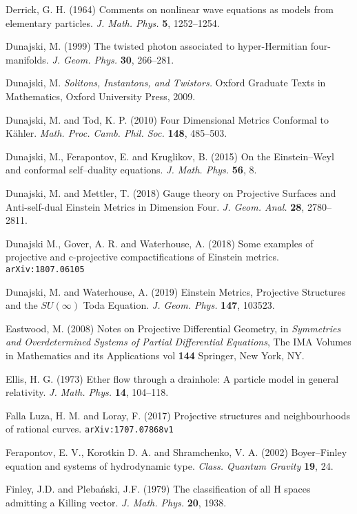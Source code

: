 \begin{thebibliography}{}
 Derrick, G. H. (1964)
Comments on nonlinear wave equations as models from elementary particles. \textit{J. Math. Phys.} {\bf 5}, 1252--1254.



 Dunajski, M. (1999) The twisted photon associated to hyper-Hermitian four-manifolds. \textit{J. Geom. Phys.} {\bf 30}, 266--281.

 Dunajski, M. \textit{Solitons, Instantons, and Twistors.} Oxford Graduate Texts in Mathematics, Oxford University Press, 2009.

 Dunajski, M. and Tod, K. P. (2010) Four Dimensional Metrics Conformal to K\"ahler. \textit{Math. Proc. Camb. Phil. Soc.} {\bf 148}, 485--503.

 Dunajski, M., Ferapontov, E. and Kruglikov, B. (2015)
On the Einstein--Weyl and conformal self--duality equations. \textit{J. Math. Phys.} {\bf 56}, 8.

 Dunajski, M. and Mettler, T. (2018) Gauge theory on Projective Surfaces and Anti-self-dual Einstein Metrics in Dimension Four.  
\textit{J. Geom. Anal.} {\bf 28}, 2780--2811.

 Dunajski M., Gover, A. R. and Waterhouse, A. (2018) Some examples of projective and c-projective compactifications of Einstein metrics.  {\tt arXiv:1807.06105}

 
 Dunajski, M. and Waterhouse, A. (2019)
Einstein Metrics, Projective Structures and the $SU(\infty)$ Toda Equation.
\textit{J. Geom. Phys.} {\bf 147}, 103523.

 Eastwood, M. (2008)
Notes on Projective Differential Geometry, in \textit{Symmetries and Overdetermined Systems of Partial Differential Equations}, The IMA Volumes in Mathematics and its Applications vol {\bf 144} Springer, New York, NY.

 Ellis, H. G. (1973)
Ether flow through a drainhole: A particle model in general relativity. \textit{J. Math. Phys.} {\bf 14}, 104--118.

 Falla Luza, H. M. and Loray, F. (2017)  Projective structures and neighbourhoods of rational curves. {\tt arXiv:1707.07868v1}

  Ferapontov, E.  V., Korotkin D. A.  and Shramchenko, V. A. (2002)
Boyer–Finley equation and systems of hydrodynamic type.
\textit{Class. Quantum Gravity} {\bf 19}, 24.

 Finley, J.D. and Pleba\'nski, J.F. (1979) The classification of all H spaces admitting a Killing
vector. \textit{J. Math. Phys.} {\bf 20}, 1938.




\end{thebibliography}
